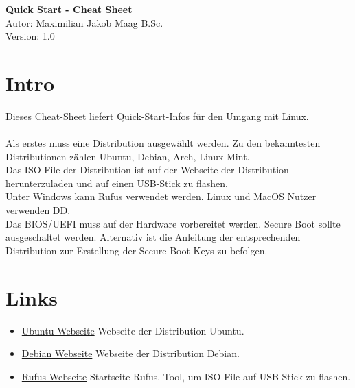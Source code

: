 \documentclass{article}
\begin{document}
    \begin{center}
        \Large \textbf{Quick Start - Cheat Sheet} \\ [6pt]
        \normalsize
        Autor: Maximilian Jakob Maag B.Sc. \\
        Version: 1.0
    \end{center}
    \section{Intro}
    Dieses Cheat-Sheet liefert Quick-Start-Infos für den Umgang mit Linux. \\\\
    Als erstes muss eine Distribution ausgewählt werden. Zu den bekanntesten Distributionen zählen Ubuntu, Debian, Arch, Linux Mint. \\
    Das ISO-File der Distribution ist auf der Webseite der Distribution herunterzuladen und auf einen USB-Stick zu flashen. \\
    Unter Windows kann Rufus verwendet werden. Linux und MacOS Nutzer verwenden DD. \\
    Das BIOS/UEFI muss auf der Hardware vorbereitet werden. Secure Boot sollte ausgeschaltet werden.
    Alternativ ist die Anleitung der entsprechenden Distribution zur Erstellung der Secure-Boot-Keys zu befolgen.
    \section{Links}
    \begin{itemize}
        \item \href{https://ubuntu.com}{Ubuntu Webseite} Webseite der Distribution Ubuntu.
        \item \href{https://www.debian.org/index.de.html}{Debian Webseite} Webseite der Distribution Debian.
        \item \href{https://rufus.ie/de/}{Rufus Webseite} Startseite Rufus. Tool, um ISO-File auf USB-Stick zu flashen.
    \end{itemize}
\end{document}
